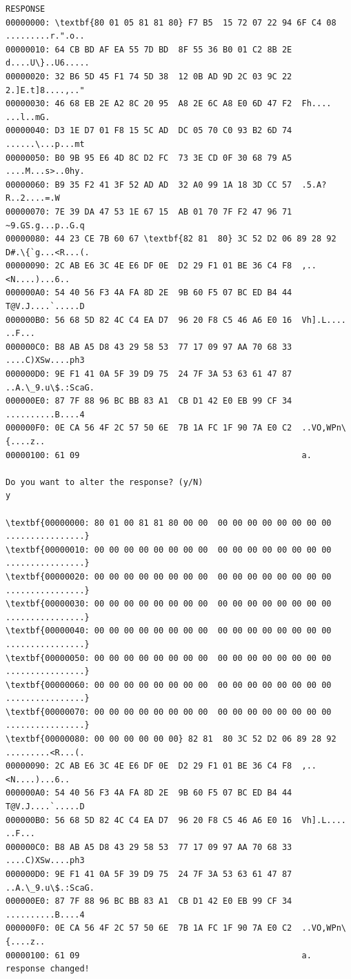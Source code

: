 \documentclass[bsc,frontabs,twoside,singlespacing,parskip,deptreport]{infthesis}     %
\begin{document}
\begin{appendices}
\begin{Verbatim}[commandchars=\\\{\}, fontsize=\small]
RESPONSE
00000000: \textbf{80 01 05 81 81 80} F7 B5  15 72 07 22 94 6F C4 08  .........r.".o..
00000010: 64 CB BD AF EA 55 7D BD  8F 55 36 B0 01 C2 8B 2E  d....U\}..U6.....
00000020: 32 B6 5D 45 F1 74 5D 38  12 0B AD 9D 2C 03 9C 22  2.]E.t]8....,.."
00000030: 46 68 EB 2E A2 8C 20 95  A8 2E 6C A8 E0 6D 47 F2  Fh.... ...l..mG.
00000040: D3 1E D7 01 F8 15 5C AD  DC 05 70 C0 93 B2 6D 74  ......\...p...mt
00000050: B0 9B 95 E6 4D 8C D2 FC  73 3E CD 0F 30 68 79 A5  ....M...s>..0hy.
00000060: B9 35 F2 41 3F 52 AD AD  32 A0 99 1A 18 3D CC 57  .5.A?R..2....=.W
00000070: 7E 39 DA 47 53 1E 67 15  AB 01 70 7F F2 47 96 71  ~9.GS.g...p..G.q
00000080: 44 23 CE 7B 60 67 \textbf{82 81  80} 3C 52 D2 06 89 28 92  D#.\{`g...<R...(.
00000090: 2C AB E6 3C 4E E6 DF 0E  D2 29 F1 01 BE 36 C4 F8  ,..<N....)...6..
000000A0: 54 40 56 F3 4A FA 8D 2E  9B 60 F5 07 BC ED B4 44  T@V.J....`.....D
000000B0: 56 68 5D 82 4C C4 EA D7  96 20 F8 C5 46 A6 E0 16  Vh].L.... ..F...
000000C0: B8 AB A5 D8 43 29 58 53  77 17 09 97 AA 70 68 33  ....C)XSw....ph3
000000D0: 9E F1 41 0A 5F 39 D9 75  24 7F 3A 53 63 61 47 87  ..A.\_9.u\$.:ScaG.
000000E0: 87 7F 88 96 BC BB 83 A1  CB D1 42 E0 EB 99 CF 34  ..........B....4
000000F0: 0E CA 56 4F 2C 57 50 6E  7B 1A FC 1F 90 7A E0 C2  ..VO,WPn\{....z..
00000100: 61 09                                             a.

Do you want to alter the response? (y/N)
y

\textbf{00000000: 80 01 00 81 81 80 00 00  00 00 00 00 00 00 00 00  ................}
\textbf{00000010: 00 00 00 00 00 00 00 00  00 00 00 00 00 00 00 00  ................}
\textbf{00000020: 00 00 00 00 00 00 00 00  00 00 00 00 00 00 00 00  ................}
\textbf{00000030: 00 00 00 00 00 00 00 00  00 00 00 00 00 00 00 00  ................}
\textbf{00000040: 00 00 00 00 00 00 00 00  00 00 00 00 00 00 00 00  ................}
\textbf{00000050: 00 00 00 00 00 00 00 00  00 00 00 00 00 00 00 00  ................}
\textbf{00000060: 00 00 00 00 00 00 00 00  00 00 00 00 00 00 00 00  ................}
\textbf{00000070: 00 00 00 00 00 00 00 00  00 00 00 00 00 00 00 00  ................}
\textbf{00000080: 00 00 00 00 00 00} 82 81  80 3C 52 D2 06 89 28 92  .........<R...(.
00000090: 2C AB E6 3C 4E E6 DF 0E  D2 29 F1 01 BE 36 C4 F8  ,..<N....)...6..
000000A0: 54 40 56 F3 4A FA 8D 2E  9B 60 F5 07 BC ED B4 44  T@V.J....`.....D
000000B0: 56 68 5D 82 4C C4 EA D7  96 20 F8 C5 46 A6 E0 16  Vh].L.... ..F...
000000C0: B8 AB A5 D8 43 29 58 53  77 17 09 97 AA 70 68 33  ....C)XSw....ph3
000000D0: 9E F1 41 0A 5F 39 D9 75  24 7F 3A 53 63 61 47 87  ..A.\_9.u\$.:ScaG.
000000E0: 87 7F 88 96 BC BB 83 A1  CB D1 42 E0 EB 99 CF 34  ..........B....4
000000F0: 0E CA 56 4F 2C 57 50 6E  7B 1A FC 1F 90 7A E0 C2  ..VO,WPn\{....z..
00000100: 61 09                                             a.
response changed!


\end{Verbatim}
\end{appendices}
\end{document}

